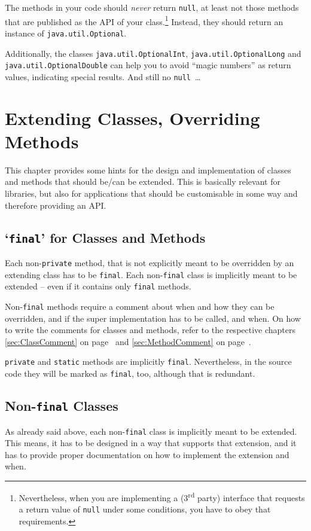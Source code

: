 \documentclass[11pt,a4paper, titlepage, parskip=half, headsepline, footsepline, cleardoublepage=current, headheight=1cm]{scrbook}
\newcommand*{\tqvref}[1]{\hyperref[{#1}]{\ref*{#1}} on page~\pageref{#1}}
\begin{document}
The methods in your code should \textit{never} return \lstinline|null|, at least not those methods that are published as the API of your class.\footnote{Nevertheless, when you are implementing a (3\textsuperscript{rd} party) interface that requests a return value of \lstinline|null| under some conditions, you have to obey that requirements.} Instead, they should return an instance of \lstinline|java.util.Optional|\autocite{ORACLE_DOC_OPTIONAL_CLASS}.

Additionally, the classes \lstinline|java.util.OptionalInt|\autocite{ORACLE_DOC_OPTIONALINT_CLASS}, \lstinline|java.util.OptionalLong|\autocite{ORACLE_DOC_OPTIONALLONG_CLASS} and \lstinline|java.util.OptionalDouble|\autocite{ORACLE_DOC_OPTIONALDOUBLE_CLASS} can help you to avoid “magic numbers” as return values, indicating special results. And still no \lstinline|null|~…

\section{Extending Classes, Overriding Methods}\label{sec:ExtendingClassesOverridingMethods}
This chapter provides some hints for the design and implementation of classes and methods that should be/can be extended. This is basically relevant for libraries, but also for applications that should be customisable in some way and therefore providing an API.

\subsection{‘\lstinline|final|’ for Classes and Methods}
Each non-\lstinline|private| method, that is not explicitly meant to be overridden by an extending class has to be \lstinline|final|. Each non-\lstinline|final| class is implicitly meant to be extended – even if it contains only \lstinline|final| methods.

Non-\lstinline|final| methods require a comment about when and how they can be overridden, and if the super implementation has to be called, and when. On how to write the comments for classes and methods, refer to the respective chapters \tqvref{sec:ClassComment} and \tqvref{sec:MethodComment}.

\lstinline|private| and \lstinline|static| methods are implicitly \lstinline|final|. Nevertheless, in the source code they will be marked as \lstinline|final|, too, although that is redundant.

\subsection{Non-\lstinline|final| Classes}\label{sec:NonFinalClasses}
As already said above, each non-\lstinline|final| class is implicitly meant to be extended. This means, it has to be designed in a way that supports that extension, and it has to provide proper documentation on how to implement the extension and when.
\end{document}

